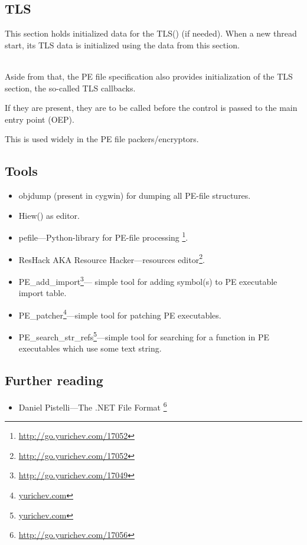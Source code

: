 \subsection{TLS}

This section holds initialized data for the \ac{TLS}() (if needed).
When a new thread start, its \ac{TLS} data is initialized using the data from this section. \\
\\

Aside from that, the PE file specification also provides initialization of the
\ac{TLS} section, the so-called TLS callbacks.

If they are present, they are to be called before the control is passed to the main entry point (\ac{OEP}).

This is used widely in the PE file packers/encryptors.

\subsection{Tools}

\label{ResHack}

\begin{itemize}
\item objdump (present in cygwin) for dumping all PE-file structures.

\item Hiew() as editor.

\item pefile---Python-library for PE-file processing \footnote{\url{http://go.yurichev.com/17052}}.

\item ResHack \acs{AKA} Resource Hacker---resources editor\footnote{\url{http://go.yurichev.com/17052}}.

\item PE\_add\_import\footnote{\url{http://go.yurichev.com/17049}}---
simple tool for adding symbol(s) to PE executable import table.

\item PE\_patcher\footnote{\href{http://go.yurichev.com/17054}{yurichev.com}}---simple tool for patching PE executables.

\item PE\_search\_str\_refs\footnote{\href{http://go.yurichev.com/17055}{yurichev.com}}---simple tool for searching for a function in PE executables which use some text string.
\end{itemize}

\subsection{Further reading}

\begin{itemize}
\item Daniel Pistelli---The .NET File Format \footnote{\url{http://go.yurichev.com/17056}}
\end{itemize}

